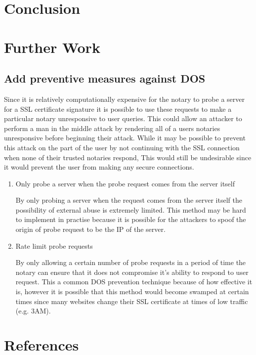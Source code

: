 \documentclass[preprint,review,12pt]{elsarticle}
\begin{document}
\section{Conclusion}
\label{conclusion}

\section{Further Work}
\label{further work}

\subsection{Add preventive measures against DOS}

Since it is relatively computationally expensive for the notary to probe a
server for a SSL certificate signature it is possible to use these requests to
make a particular notary unresponsive to user queries. This could allow an
attacker to perform a man in the middle attack by rendering all of a users
notaries unresponsive before beginning their attack. While it may be possible
to prevent this attack on the part of the user by not continuing with the SSL
connection when none of their trusted notaries respond, This would still be
undesirable since it would prevent the user from making any secure connections.

\begin{enumerate}
    \item {Only probe a server when the probe request comes from the server itself}

        By only probing a server when the request comes from the server itself
        the possibility of external abuse is extremely limited. This method may
        be hard to implement in practise because it is possible for the
        attackers to spoof the origin of probe request to be the IP of the
        server.

    \item {Rate limit probe requests}

        By only allowing a certain number of probe requests in a period of time
        the notary can ensure that it does not compromise it's ability to
        respond to user request. This a common DOS prevention technique because
        of how effective it is, however it is possible that this method would
        become swamped at certain times since many websites change their SSL
        certificate at times of low traffic (e.g. 3AM).

\end{enumerate}

\section{References}
\label{references}
\nocite{*}


\end{document}
